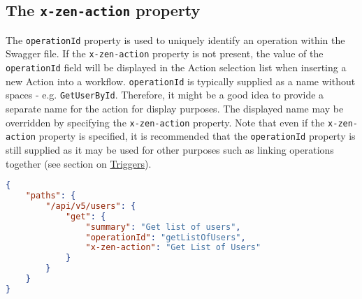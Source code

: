 \subsection{The \texttt{x-zen-action} property}
The \texttt{operationId} property is used to uniquely identify an operation within the Swagger file. If the \texttt{x-zen-action} property is not present, the value of the \texttt{operationId} field will be displayed in the Action selection list when inserting a new Action into a workflow. \texttt{operationId} is typically supplied as a name without spaces - e.g. \texttt{GetUserById}. Therefore, it might be a good idea to provide a separate name for the action for display purposes. The displayed name may be overridden by specifying the \texttt{x-zen-action} property. Note that even if the \texttt{x-zen-action} property is specified, it is recommended that the \texttt{operationId} property is still supplied as it may be used for other purposes such as linking operations together (see section on \hyperref[sec:triggers]{Triggers}).\\
\begin{minipage}{\textwidth}
\begin{lstlisting}[caption={\texttt{x-zen-action} usage},label={code:x-zen-action},language=json]
{
    "paths": {
        "/api/v5/users": {
            "get": {
                "summary": "Get list of users",
                "operationId": "getListOfUsers",
                "x-zen-action": "Get List of Users"
            }
        }
    }
}
\end{lstlisting}
\end{minipage}

